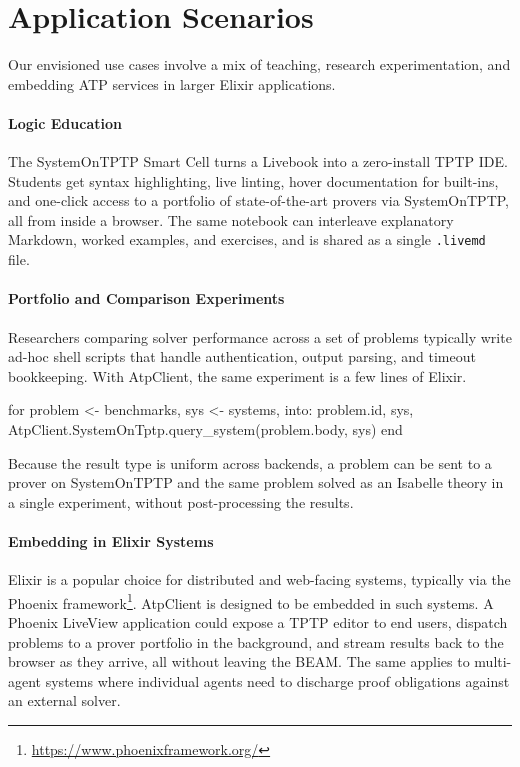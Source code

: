 \documentclass[]{ceurart}
\begin{document}
\section{Application Scenarios}\label{sec:6}

Our envisioned use cases involve a mix of teaching, research experimentation, and embedding ATP services in larger Elixir applications.

\paragraph{Logic Education}

The SystemOnTPTP Smart Cell turns a Livebook into a zero-install TPTP IDE. Students get syntax highlighting, live linting, hover documentation for built-ins, and one-click access to a portfolio of state-of-the-art provers via SystemOnTPTP, all from inside a browser. The same notebook can interleave explanatory Markdown, worked examples, and exercises, and is shared as a single \texttt{.livemd} file.

\paragraph{Portfolio and Comparison Experiments}

Researchers comparing solver performance across a set of problems typically write ad-hoc shell scripts that handle authentication, output parsing, and timeout bookkeeping. With AtpClient, the same experiment is a few lines of Elixir.

\begin{elixir}
for problem <- benchmarks, sys <- systems, into: %
  {{problem.id, sys}, AtpClient.SystemOnTptp.query_system(problem.body, sys)}
end
\end{elixir}

\noindent Because the result type is uniform across backends, a problem can be sent to a prover on SystemOnTPTP and the same problem solved as an Isabelle theory in a single experiment, without post-processing the results.

\paragraph{Embedding in Elixir Systems}

Elixir is a popular choice for distributed and web-facing systems, typically via the Phoenix framework\footnote{\url{https://www.phoenixframework.org/}}. AtpClient is designed to be embedded in such systems. A Phoenix LiveView application could expose a TPTP editor to end users, dispatch problems to a prover portfolio in the background, and stream results back to the browser as they arrive, all without leaving the BEAM. The same applies to multi-agent systems where individual agents need to discharge proof obligations against an external solver.
\end{document}
